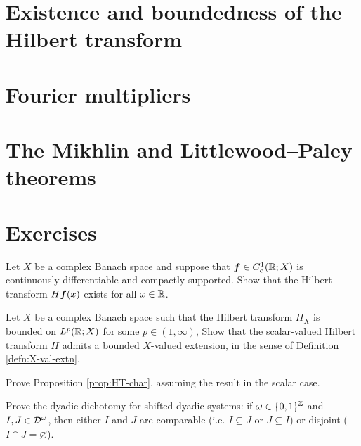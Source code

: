 \begin{thm}
  
\end{thm}

\section{Existence and boundedness of the Hilbert transform}

\section{Fourier multipliers}

\section{The Mikhlin and Littlewood--Paley  theorems}

\section{Exercises}

\begin{exercise}\label{ex:HT-C1}
  Let $X$ be a complex Banach space and suppose that $\bm{f} \in C_{c}^1(\mathbb{R};X)$ is continuously differentiable and compactly supported.
  Show that the Hilbert transform $H\bm{f}(x)$ exists for all $x \in \mathbb{R}$.
\end{exercise}

\begin{exercise}
  Let $X$ be a complex Banach space such that the Hilbert transform $H_{X}$ is bounded on $L^p(\mathbb{R};X)$ for some $p \in (1,\infty)$,
  Show that the scalar-valued Hilbert transform $H$ admits a bounded $X$-valued extension, in the sense of Definition \ref{defn:X-val-extn}.
\end{exercise}

\begin{exercise}\label{ex:HT-char}
  Prove Proposition \ref{prop:HT-char}, assuming the result in the scalar case.
\end{exercise}

\begin{exercise}\label{ex:dyadic-dichotomy}
  Prove the dyadic dichotomy for shifted dyadic systems: if $\omega \in \{0,1\}^{\mathbb{Z}}$ and $I,J \in \mathcal{D}^{\omega}$, then either $I$ and $J$ are comparable (i.e. $I \subseteq J$ or $J \subseteq I$) or disjoint ($I \cap J = \varnothing$).
\end{exercise}

